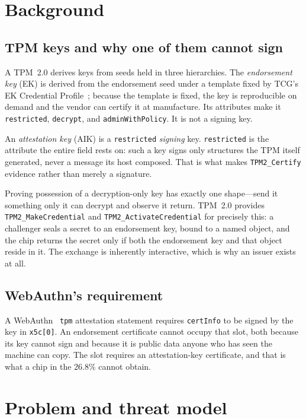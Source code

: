 \documentclass[conference,10pt]{IEEEtran}
\begin{document}
\section{Background}

\subsection{TPM keys and why one of them cannot sign}

A TPM~2.0 derives keys from seeds held in three hierarchies. The \emph{endorsement key} (EK) is derived
from the endorsement seed under a template fixed by TCG's EK Credential Profile~\cite{tcgek}; because
the template is fixed, the key is reproducible on demand and the vendor can certify it at manufacture.
Its attributes make it \texttt{restricted}, \texttt{decrypt}, and \texttt{adminWithPolicy}. It is not a
signing key.

An \emph{attestation key} (AIK) is a \texttt{restricted} \emph{signing} key. \texttt{restricted} is the
attribute the entire field rests on: such a key signs only structures the TPM itself generated, never a
message its host composed. That is what makes \texttt{TPM2\_Certify} evidence rather than merely a
signature.

Proving possession of a decryption-only key has exactly one shape---send it something only it can
decrypt and observe it return. TPM~2.0 provides \texttt{TPM2\_MakeCredential} and
\texttt{TPM2\_ActivateCredential} for precisely this: a challenger seals a secret to an endorsement
key, bound to a named object, and the chip returns the secret only if both the endorsement key and that
object reside in it. The exchange is inherently interactive, which is why an issuer exists at all.

\subsection{WebAuthn's requirement}

A WebAuthn~\cite{webauthn} \texttt{tpm} attestation statement requires \texttt{certInfo} to be signed by
the key in \texttt{x5c[0]}. An endorsement certificate cannot occupy that slot, both because its key
cannot sign and because it is public data anyone who has seen the machine can copy. The slot requires
an attestation-key certificate, and that is what a chip in the $26.8\%$ cannot obtain.

\section{Problem and threat model}
\label{sec:threat}
\end{document}
